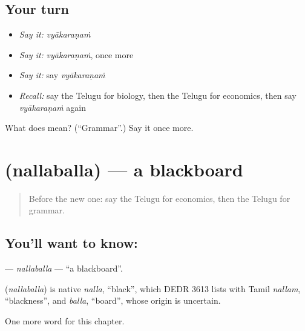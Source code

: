 \subsection*{Your turn}
\begin{itemize}
\raggedright
  \item \emph{Say it:} \emph{vyākaraṇaṁ}
  \item \emph{Say it:} \emph{vyākaraṇaṁ}, once more
  \item \emph{Say it:} say \emph{vyākaraṇaṁ}
  \item \emph{Recall:} say the Telugu for biology, then the Telugu for economics, then say \emph{vyākaraṇaṁ} again
\end{itemize}

\begin{tcolorbox}[breakable,colback=teal!4,colframe=teal!35!black,title={Before you move on}]
What does  mean? (\textquotedblleft{}Grammar\textquotedblright{}.) Say it once more.
\end{tcolorbox}
\section[\texorpdfstring{\te{నల్లబల్ల} (nallaballa)}{నల్లబల్ల (nallaballa)}]{ (nallaballa) — a blackboard}

\label{lesson:TE-C276-nallaballa}



\begin{quote}
Before the new one: say the Telugu for economics, then the Telugu for grammar.
\end{quote}

\subsection*{You'll want to know: }
\textbf{} — \emph{nallaballa} — \textquotedblleft{}a blackboard\textquotedblright{}.

\begin{cousinweb}
\textbf{} (\emph{nallaballa}) is native \emph{nalla}, \textquotedblleft{}black\textquotedblright{}, which DEDR 3613 lists with Tamil \emph{nallam}, \textquotedblleft{}blackness\textquotedblright{}, and \emph{balla}, \textquotedblleft{}board\textquotedblright{}, whose origin is uncertain.
\end{cousinweb}

\begin{grammarlens}[title={What you've built}]
One more word for this chapter.
\end{grammarlens}

